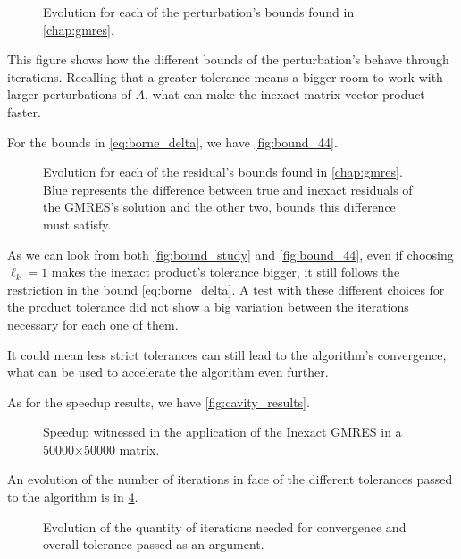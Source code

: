 \begin{figure}[h!]
    \centering
    
    \caption{Evolution for each of the perturbation's bounds found in \autoref{chap:gmres}.}
    \label{fig:bound_study}
\end{figure}

This figure shows how the different bounds of the perturbation's behave through iterations. Recalling that a greater tolerance means a bigger room to work with larger perturbations of $A$, what can make the inexact matrix-vector product faster.


For the bounds in \ref{eq:borne_delta}, we have \autoref{fig:bound_44}.

\begin{figure}[h!]
    \centering
    
    \caption{Evolution for each of the residual's bounds found in \autoref{chap:gmres}. Blue represents the difference between true and inexact residuals of the GMRES's solution and the other two, bounds this difference must satisfy.}
    \label{fig:bound_44}
\end{figure}

As we can look from both \autoref{fig:bound_study} and \autoref{fig:bound_44}, even if choosing $\ell_{k} = 1$ makes the inexact product's tolerance bigger, it still follows the restriction in the bound \ref{eq:borne_delta}. A test with these different choices for the product tolerance did not show a big variation between the iterations necessary for each one of them.

It could mean less strict tolerances can still lead to the algorithm's convergence, what can be used to accelerate the algorithm even further.

As for the speedup results, we have \autoref{fig:cavity_results}.

\begin{figure}[h!]
    \centering
    
    \caption{Speedup witnessed in the application of the Inexact GMRES in a 50000×50000 matrix.}
    \label{fig:cavity_results}
\end{figure}

An evolution of the number of iterations in face of the different tolerances passed to the algorithm is in \ref{fig:cavity_iterations}.

\begin{figure}[h!]
    \centering
    
    \caption{Evolution of the quantity of iterations needed for convergence and overall tolerance passed as an argument.}
    \label{fig:cavity_iterations}
\end{figure}



